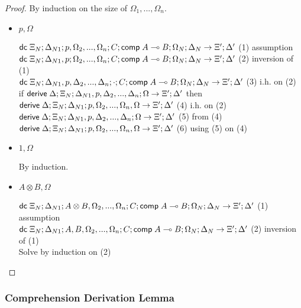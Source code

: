 \begin{proof}
   By induction on the size of $\Omega_1, ..., \Omega_n$.
   
   \begin{itemize}
      \item $p, \Omega$
      
      $\mathsf{dc} \; \Xi_N; \Delta_{N1}; p, \Omega_2, ..., \Omega_n; C; \mathsf{comp} \; A \multimap B; \Omega_N; \Delta_N \rightarrow \Xi'; \Delta'$ \hfill (1) assumption \\
      $\mathsf{dc} \; \Xi_N; \Delta_{N1}, p; \Omega_2, ..., \Omega_n; C; \mathsf{comp} \; A \multimap B; \Omega_N; \Delta_N \rightarrow \Xi'; \Delta'$ \hfill (2) inversion of (1) \\
      $\mathsf{dc} \; \Xi_N; \Delta_{N1}, p, \Delta_2, ..., \Delta_n; \cdot; C; \mathsf{comp} \; A \multimap B; \Omega_N; \Delta_N \rightarrow \Xi'; \Delta'$ \hfill (3) i.h. on (2) \\
      if $\mathsf{derive} \; \Delta; \Xi_N; \Delta_{N1}, p, \Delta_2, ..., \Delta_n; \Omega \rightarrow \Xi'; \Delta'$ then $\mathsf{derive} \; \Delta; \Xi_N; \Delta_{N1}; p, \Omega_2, ..., \Omega_n, \Omega \rightarrow \Xi'; \Delta'$ \hfill (4) i.h. on (2) \\
      $\mathsf{derive} \; \Delta; \Xi_N; \Delta_{N1}, p, \Delta_2, ..., \Delta_n; \Omega \rightarrow \Xi'; \Delta'$ \hfill (5) from (4) \\
      $\mathsf{derive} \; \Delta; \Xi_N; \Delta_{N1}; p, \Omega_2, ..., \Omega_n, \Omega \rightarrow \Xi'; \Delta'$ \hfill (6) using (5) on (4) \\
      
      \item $1, \Omega$
      
      By induction.
      
      \item $A \otimes B, \Omega$
      
      $\mathsf{dc} \; \Xi_N; \Delta_{N1}; A \otimes B, \Omega_2, ..., \Omega_n; C; \mathsf{comp} \; A \multimap B; \Omega_N; \Delta_N \rightarrow \Xi'; \Delta'$ \hfill (1) assumption \\
      $\mathsf{dc} \; \Xi_N; \Delta_{N1}; A, B, \Omega_2, ..., \Omega_n; C; \mathsf{comp} \; A \multimap B; \Omega_N; \Delta_N \rightarrow \Xi'; \Delta'$ \hfill (2) inversion of (1) \\
      Solve by induction on (2) \\
   \end{itemize}
\end{proof}

\subsubsection{Comprehension Derivation Lemma}


